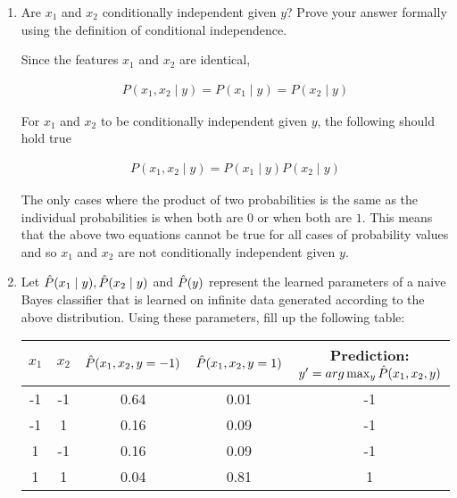 \begin{enumerate}
  \begin{enumerate}
  \item \relax[1 point] Are $x_1$ and $x_2$ conditionally independent
    given $y$? Prove your answer formally using the definition of
    conditional independence.

Since the features $x_1$ and $x_2$ are identical,
    
\begin{equation*}
\begin{aligned}
P(x_1,x_2 \mid y) = P(x_1 \mid y) = P(x_2 \mid y)
\end{aligned}
\end{equation*} 

For $x_1$ and $x_2$ to be conditionally independent given $y$, the following should hold true

\begin{equation*}
\begin{aligned}
P(x_1,x_2 \mid y) = P(x_1 \mid y) P(x_2 \mid y)
\end{aligned}
\end{equation*} 

The only cases where the product of two probabilities is the same as the individual probabilities is when both are $0$ or when both are $1$. This means that the above two equations cannot be true for all cases of probability values and so $x_1$ and $x_2$ are not conditionally independent given $y$.
    
  \item \relax[8 points] Let $\hat{P}(x_1 \mid y), \hat{P}(x_2 \mid y)$ and
    $\hat{P}(y)$ represent the learned parameters of a naive Bayes
    classifier that is learned on infinite data generated according to
    the above distribution. Using these parameters, fill up the
    following table:


    \begin{tabular}{|c|c|c|c|c|}
      \hline
      $x_1$ & $x_2$ & $\hat{P}(x_1, x_2, y= -1)$ & $\hat{P}(x_1, x_2, y=1)$ & {\bf Prediction: $y' = arg\max_y \hat{P}(x_1, x_2, y)$} \\
      \hline
      -1    & -1    &    0.64                    & 0.01                     &    -1                                               \\
      -1    & 1     &     0.16                   &  0.09                    &     -1                                              \\
      1     & -1    &      0.16                  &   0.09                   &      -1                                             \\
      1     & 1     &      0.04                  &   0.81                   &       1                                            \\
      \hline
    \end{tabular}


\end{enumerate}
\end{enumerate}
